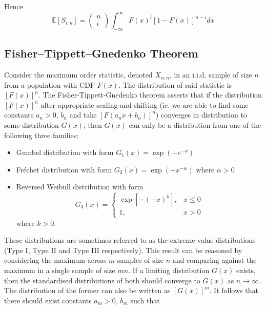 \documentclass[11pt]{report} %
\begin{document}
Hence
\begin{equation}
\mathbb{E}\left[S_{i:n}\right] = \begin{pmatrix}n\\i\end{pmatrix}\int_{-\infty}^{\infty}F\left(x\right)^{i}\left[1-F\left(x\right)\right]^{n-i}dx
\end{equation}

\subsection{Fisher–Tippett–Gnedenko Theorem \cite{David2005}}

Consider the maximum order statistic, denoted $X_{n:n}$, in an i.i.d. sample of size $n$ from a population with CDF $F\left(x\right)$. The distribution of said statistic is $\left[F\left(x\right)\right]^{n}$. The Fisher-Tippett-Gnedenko theorem asserts that if the distribution $\left[F\left(x\right)\right]^{n}$ after appropriate scaling and shifting (ie. we are able to find some constants $a_{n} > 0$, $b_{n}$ and take $\left[F\left(a_{n}x + b_{n}\right)\right]^{n}$) converges in distribution to some distribution $G\left(x\right)$, then $G\left(x\right)$ can only be a distribution from one of the following three families:
\begin{itemize}
\item Gumbel distribution with form $G_{1}\left(x\right) = \exp\left(-e^{-x}\right)$
\item Fr\'{e}chet distribution with form $G_{2}\left(x\right) = \exp\left(-x^{-\alpha}\right)$ where $\alpha > 0$
\item Reversed Weibull distribution with form
\begin{equation}
G_{3}\left(x\right) = \begin{cases} \exp\left[-\left(-x\right)^{k}\right], & x \leq 0 \\ 1, & x > 0 \end{cases}
\end{equation}
where $k > 0$.
\end{itemize}
These distributions are sometimes referred to as the extreme value distributions (Type I, Type II and Type III respectively). This result can be reasoned by considering the maximum across $m$ samples of size $n$ and comparing against the maximum in a single sample of size $mn$. If a limiting distribution $G\left(x\right)$ exists, then the standardised distributions of both should converge to $G\left(x\right)$ as $n \to \infty$. The distribution of the former can also be written as $\left[G\left(x\right)\right]^{m}$. It follows that there should exist constants $a_{m} > 0$, $b_{m}$ such that
\end{document}
